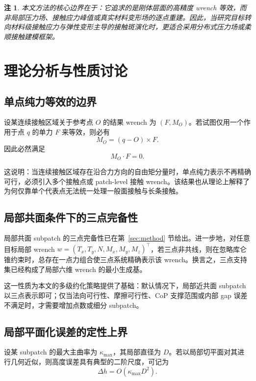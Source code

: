 \documentclass[UTF8,a4paper,11pt]{ctexart}
\newtheorem{remark}{注}[section]
\begin{document}
\begin{remark}
本文方法的核心边界在于：它追求的是刚体层面的高精度 wrench 等效，而非局部压力场、接触应力峰值或真实材料变形场的逐点重建。因此，当研究目标转向材料级接触应力与弹性变形主导的接触斑演化时，更适合采用分布式压力场或柔顺接触建模框架。
\end{remark}

\section{理论分析与性质讨论}
\label{sec:analysis}

\subsection{单点纯力等效的边界}

设某连续接触区域关于参考点 $O$ 的结果 wrench 为 $(F,M_O)$。若试图仅用一个作用于点 $q$ 的单力 $F$ 来等效，则必有
\begin{equation}
M_O = (q-O)\times F.
\end{equation}
因此必然满足
\begin{equation}
M_O \cdot F = 0.
\end{equation}

这说明：当连续接触区域存在沿合力方向的自由矩分量时，单点纯力表示不再精确可行，必须引入多个接触点或 patch-level 接触 wrench。该结果也从理论上解释了为何仅靠单个代表点无法统一处理一般面接触与长条接触。

\subsection{局部共面条件下的三点完备性}

局部共面 subpatch 的三点完备性已在第~\ref{sec:method} 节给出。进一步地，对任意目标局部 wrench $w=(T_x,T_y,N,M_x,M_y,M_z)^\top$，若三点非共线，则在忽略库仑锥约束时，总存在一点力组合使三点系统精确表示该 wrench。换言之，三点支持集已经构成了局部六维 wrench 的最小生成基。

这一性质为本文的多级约化策略提供了基础：默认情况下，局部近共面 subpatch 以三点表示即可；仅当法向可行性、摩擦可行性、CoP 支撑范围或内部 gap 误差不满足时，才需要增加点数或细分 subpatch。

\subsection{局部平面化误差的定性上界}

设某 subpatch 的最大主曲率为 $\kappa_{\max}$，其局部直径为 $D$。若以局部切平面对其进行几何近似，则高度误差具有典型的二阶尺度，可记为
\begin{equation}
\Delta h = O(\kappa_{\max} D^2).
\end{equation}
\end{document}
